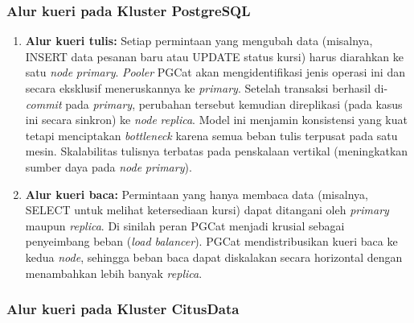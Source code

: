 \subsubsection{Alur kueri pada Kluster PostgreSQL}

\begin{enumerate}
    \item \textbf{Alur kueri tulis:} Setiap permintaan yang mengubah data (misalnya, INSERT data pesanan baru atau UPDATE status kursi) harus diarahkan ke satu \textit{node} \textit{primary}. \textit{Pooler} PGCat akan mengidentifikasi jenis operasi ini dan secara eksklusif meneruskannya ke \textit{primary}. Setelah transaksi berhasil di-\textit{commit} pada \textit{primary}, perubahan tersebut kemudian direplikasi (pada kasus ini secara sinkron) ke \textit{node} \textit{replica}. Model ini menjamin konsistensi yang kuat tetapi menciptakan \textit{bottleneck} karena semua beban tulis terpusat pada satu mesin. Skalabilitas tulisnya terbatas pada penskalaan vertikal (meningkatkan sumber daya pada \textit{node} \textit{primary}).
    \item \textbf{Alur kueri baca:} Permintaan yang hanya membaca data (misalnya, SELECT untuk melihat ketersediaan kursi) dapat ditangani oleh \textit{primary} maupun \textit{replica}. Di sinilah peran PGCat menjadi krusial sebagai penyeimbang beban (\textit{load balancer}). PGCat mendistribusikan kueri baca ke kedua \textit{node}, sehingga beban baca dapat diskalakan secara horizontal dengan menambahkan lebih banyak \textit{replica}.
\end{enumerate}

\subsubsection{Alur kueri pada Kluster CitusData}

